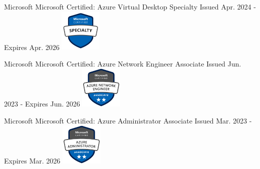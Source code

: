 \graphicspath{ {./images/} }




\begin{cventries}


\cventry
{Microsoft\vspace{2mm}} %
{Microsoft Certified: Azure Virtual Desktop Specialty} %
{} %
{Issued Apr. 2024 - Expires Apr. 2026} %
{ %
\includegraphics[height=2cm]{az-140}
}


\cventry
{Microsoft\vspace{2mm}} %
{Microsoft Certified: Azure Network Engineer Associate} %
{} %
{Issued Jun. 2023 - Expires Jun. 2026} %
{ %
\includegraphics[height=2cm]{az-700}
}


\cventry
{Microsoft\vspace{2mm}} %
{Microsoft Certified: Azure Administrator Associate} %
{} %
{Issued Mar. 2023 - Expires Mar. 2026} %
{ %
\includegraphics[height=2cm]{az-104}
}


\end{cventries}

